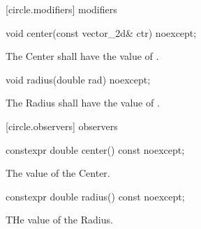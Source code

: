  [circle.modifiers]{ modifiers}

\begin{itemdecl}
void center(const vector_2d& ctr) noexcept;
\end{itemdecl}

\begin{itemdescr}
\pnum
\effects
The Center shall have the value of .
\end{itemdescr}

\begin{itemdecl}
void radius(double rad) noexcept;
\end{itemdecl}
\begin{itemdescr}
\pnum
\effects
The Radius shall have the value of .
\end{itemdescr}

 [circle.observers]{ observers}

\begin{itemdecl}
constexpr double center() const noexcept;
\end{itemdecl}
\begin{itemdescr}
\pnum
\returns
The value of the Center.
\end{itemdescr}

\begin{itemdecl}
constexpr double radius() const noexcept;
\end{itemdecl}
\begin{itemdescr}
\pnum
\returns
THe value of the Radius.
\end{itemdescr}
